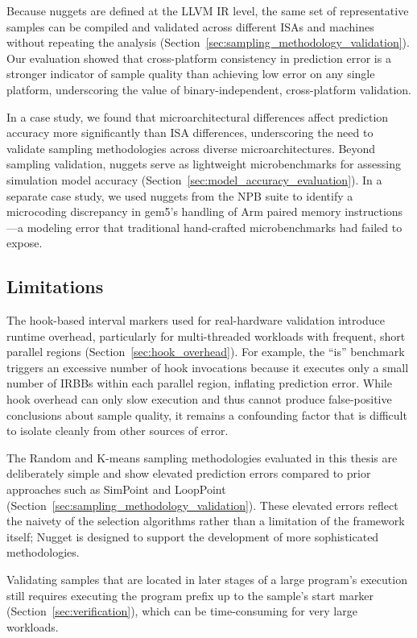 Because nuggets are defined at the LLVM IR level, the same set of representative samples can be compiled and validated across different ISAs and machines without repeating the analysis (Section~\ref{sec:sampling_methodology_validation}).
Our evaluation showed that cross-platform consistency in prediction error is a stronger indicator of sample quality than achieving low error on any single platform, underscoring the value of binary-independent, cross-platform validation.

In a case study, we found that microarchitectural differences affect prediction accuracy more significantly than ISA differences, underscoring the need to validate sampling methodologies across diverse microarchitectures.
Beyond sampling validation, nuggets serve as lightweight microbenchmarks for assessing simulation model accuracy (Section~\ref{sec:model_accuracy_evaluation}).
In a separate case study, we used nuggets from the NPB suite to identify a microcoding discrepancy in gem5's handling of Arm paired memory instructions---a modeling error that traditional hand-crafted microbenchmarks had failed to expose.

\subsection{Limitations}

The hook-based interval markers used for real-hardware validation introduce runtime overhead, particularly for multi-threaded workloads with frequent, short parallel regions (Section~\ref{sec:hook_overhead}).
For example, the ``is'' benchmark triggers an excessive number of hook invocations because it executes only a small number of IRBBs within each parallel region, inflating prediction error.
While hook overhead can only slow execution and thus cannot produce false-positive conclusions about sample quality, it remains a confounding factor that is difficult to isolate cleanly from other sources of error.

The Random and K-means sampling methodologies evaluated in this thesis are deliberately simple and show elevated prediction errors compared to prior approaches such as SimPoint and LoopPoint (Section~\ref{sec:sampling_methodology_validation}).
These elevated errors reflect the naivety of the selection algorithms rather than a limitation of the framework itself; Nugget is designed to support the development of more sophisticated methodologies.

Validating samples that are located in later stages of a large program's execution still requires executing the program prefix up to the sample's start marker (Section~\ref{sec:verification}), which can be time-consuming for very large workloads.

